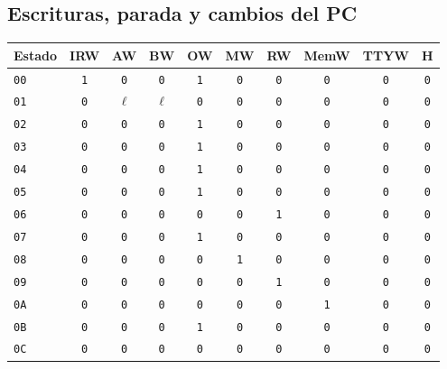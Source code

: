 \documentclass[11pt,a4paper]{article}
\begin{document}
\subsection{Escrituras, parada y cambios del PC}
\begin{center}
\footnotesize
\setlength{\tabcolsep}{5.4pt}
\begin{tabular}{@{}lccccccccc@{}}
\toprule
Estado & IRW & AW & BW & OW & MW & RW & MemW & TTYW & H \\
\midrule
\texttt{00} & \texttt{1} & \texttt{0} & \texttt{0} & \texttt{1} & \texttt{0} & \texttt{0} & \texttt{0} & \texttt{0} & \texttt{0} \\
\texttt{01} & \texttt{0} & $\ell$ & $\ell$ & \texttt{0} & \texttt{0} & \texttt{0} & \texttt{0} & \texttt{0} & \texttt{0} \\
\texttt{02} & \texttt{0} & \texttt{0} & \texttt{0} & \texttt{1} & \texttt{0} & \texttt{0} & \texttt{0} & \texttt{0} & \texttt{0} \\
\texttt{03} & \texttt{0} & \texttt{0} & \texttt{0} & \texttt{1} & \texttt{0} & \texttt{0} & \texttt{0} & \texttt{0} & \texttt{0} \\
\texttt{04} & \texttt{0} & \texttt{0} & \texttt{0} & \texttt{1} & \texttt{0} & \texttt{0} & \texttt{0} & \texttt{0} & \texttt{0} \\
\texttt{05} & \texttt{0} & \texttt{0} & \texttt{0} & \texttt{1} & \texttt{0} & \texttt{0} & \texttt{0} & \texttt{0} & \texttt{0} \\
\texttt{06} & \texttt{0} & \texttt{0} & \texttt{0} & \texttt{0} & \texttt{0} & \texttt{1} & \texttt{0} & \texttt{0} & \texttt{0} \\
\texttt{07} & \texttt{0} & \texttt{0} & \texttt{0} & \texttt{1} & \texttt{0} & \texttt{0} & \texttt{0} & \texttt{0} & \texttt{0} \\
\texttt{08} & \texttt{0} & \texttt{0} & \texttt{0} & \texttt{0} & \texttt{1} & \texttt{0} & \texttt{0} & \texttt{0} & \texttt{0} \\
\texttt{09} & \texttt{0} & \texttt{0} & \texttt{0} & \texttt{0} & \texttt{0} & \texttt{1} & \texttt{0} & \texttt{0} & \texttt{0} \\
\texttt{0A} & \texttt{0} & \texttt{0} & \texttt{0} & \texttt{0} & \texttt{0} & \texttt{0} & \texttt{1} & \texttt{0} & \texttt{0} \\
\texttt{0B} & \texttt{0} & \texttt{0} & \texttt{0} & \texttt{1} & \texttt{0} & \texttt{0} & \texttt{0} & \texttt{0} & \texttt{0} \\
\texttt{0C} & \texttt{0} & \texttt{0} & \texttt{0} & \texttt{0} & \texttt{0} & \texttt{0} & \texttt{0} & \texttt{0} & \texttt{0} \\

\end{tabular}
\end{center}
\end{document}
